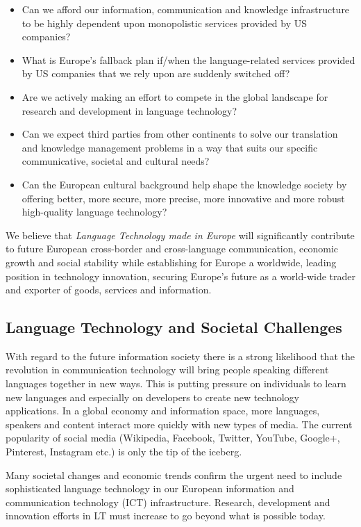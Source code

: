 \documentclass[10pt, plain]{../../metanetpaper}
\begin{document}
\begin{multicols}{2}
\begin{itemize}
\item Can we afford our information, communication and knowledge infrastructure to be highly dependent upon monopolistic services provided by US companies?
\item What is Europe's fallback plan if/when the language-related services provided by US companies that we rely upon are suddenly switched off?
\item Are we actively making an effort to compete in the global landscape for research and development in language technology?
\item Can we expect third parties from other continents to solve our translation and knowledge management problems in a way that suits our specific communicative, societal and cultural needs?
\item Can the European cultural background help shape the knowledge society by offering better, more secure, more precise, more innovative and more robust high-quality language technology?
\end{itemize}

We believe that \emph{Language Technology made in Europe} will significantly contribute to future European cross-border and cross-language communication, economic growth and social stability while establishing for Europe a worldwide, leading position in technology innovation, securing Europe's future as a world-wide trader and exporter of goods, services and information.

\subsection{Language Technology and Societal Challenges}
\label{sec:what-soci-challenges}

With regard to the future information society there is a strong likelihood that the revolution in communication technology will bring people speaking different languages together in new ways. This is putting pressure on individuals to learn new languages and especially on developers to create new technology applications. In a global economy and information space, more languages, speakers and content interact more quickly with new types of media. The current popularity of social media (Wikipedia, Facebook, Twitter, YouTube, Google+, Pinterest, Instagram etc.) is only the tip of the iceberg.

Many societal changes and economic trends confirm the urgent need to include sophisticated language technology in our European information and communication technology (ICT) infrastructure. Research, development and innovation efforts in LT must increase to go beyond what is possible today.


\end{multicols}
\end{document}
